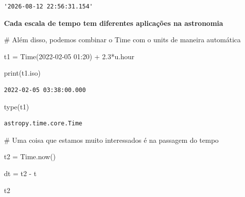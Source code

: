 \documentclass[
  letterpaper,
  DIV=11,
  numbers=noendperiod]{scrreprt}
\newenvironment{Shaded}{\begin{snugshade}}{\end{snugshade}}
\newcommand{\BuiltInTok}[1]{\textcolor[rgb]{0.00,0.23,0.31}{#1}}
\newcommand{\CommentTok}[1]{\textcolor[rgb]{0.37,0.37,0.37}{#1}}
\newcommand{\FloatTok}[1]{\textcolor[rgb]{0.68,0.00,0.00}{#1}}
\newcommand{\NormalTok}[1]{\textcolor[rgb]{0.00,0.23,0.31}{#1}}
\newcommand{\OperatorTok}[1]{\textcolor[rgb]{0.37,0.37,0.37}{#1}}
\newcommand{\StringTok}[1]{\textcolor[rgb]{0.13,0.47,0.30}{#1}}
\begin{document}
\begin{verbatim}
'2026-08-12 22:56:31.154'
\end{verbatim}

\textbf{Cada escala de tempo tem diferentes aplicações na astronomia}

\begin{Shaded}
\begin{Highlighting}[]
\CommentTok{\# Além disso, podemos combinar o Time com o units de maneira automática}

\NormalTok{t1 }\OperatorTok{=}\NormalTok{ Time(}\StringTok{\textquotesingle{}2022{-}02{-}05 01:20\textquotesingle{}}\NormalTok{) }\OperatorTok{+} \FloatTok{2.3}\OperatorTok{*}\NormalTok{u.hour}

\BuiltInTok{print}\NormalTok{(t1.iso)}
\end{Highlighting}
\end{Shaded}

\begin{verbatim}
2022-02-05 03:38:00.000
\end{verbatim}

\begin{Shaded}
\begin{Highlighting}[]
\BuiltInTok{type}\NormalTok{(t1)}
\end{Highlighting}
\end{Shaded}

\begin{verbatim}
astropy.time.core.Time
\end{verbatim}

\begin{Shaded}
\begin{Highlighting}[]
\CommentTok{\# Uma coisa que estamos muito interessados é na passagem do tempo}

\NormalTok{t2 }\OperatorTok{=}\NormalTok{ Time.now()}
\end{Highlighting}
\end{Shaded}

\begin{Shaded}
\begin{Highlighting}[]
\NormalTok{dt }\OperatorTok{=}\NormalTok{ t2 }\OperatorTok{{-}}\NormalTok{ t}
\end{Highlighting}
\end{Shaded}

\begin{Shaded}
\begin{Highlighting}[]
\NormalTok{t2}
\end{Highlighting}
\end{Shaded}
\end{document}
